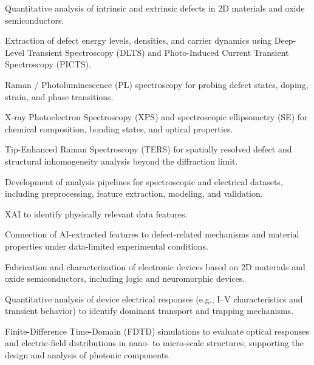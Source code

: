 \documentclass[11pt, a4paper]{awesome-cv}
\begin{document}
\begin{cvitems}
  \item {Quantitative analysis of intrinsic and extrinsic defects in 2D materials and oxide semiconductors.}
  \item {Extraction of defect energy levels, densities, and carrier dynamics using Deep-Level Transient Spectroscopy (DLTS) and Photo-Induced Current Transient Spectroscopy (PICTS).}
  \item {Raman / Photoluminescence (PL) spectroscopy for probing defect states, doping, strain, and phase transitions.}
  \item {X-ray Photoelectron Spectroscopy (XPS) and spectroscopic ellipsometry (SE) for chemical composition, bonding states, and optical properties.}
  \item {Tip-Enhanced Raman Spectroscopy (TERS) for spatially resolved defect and structural inhomogeneity analysis beyond the diffraction limit.}
\end{cvitems}

\begin{cvitems}
  \item {Development of analysis pipelines for spectroscopic and electrical datasets, including preprocessing, feature extraction, modeling, and validation.}
  \item {XAI to identify physically relevant data features.}
  \item {Connection of AI-extracted features to defect-related mechanisms and material properties under data-limited experimental conditions.}
\end{cvitems}

\begin{cvitems}
  \item {Fabrication and characterization of electronic devices based on 2D materials and oxide semiconductors, including logic and neuromorphic devices.}
  \item {Quantitative analysis of device electrical responses (e.g., I--V characteristics and transient behavior) to identify dominant transport and trapping mechanisms.}
  \item {Finite-Difference Time-Domain (FDTD) simulations to evaluate optical responses and electric-field distributions in nano- to micro-scale structures, supporting the design and analysis of photonic components.}
\end{cvitems}
\end{document}
